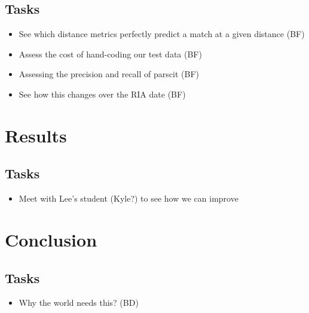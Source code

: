 \documentclass[12pt]{article}
\begin{document}
\subsection{Tasks}

\begin{itemize}
\item See which distance metrics perfectly predict a match at a given distance (BF)
\item Assess the cost of hand-coding our test data (BF)
\item Assessing the precision and recall of parscit (BF)
\item See how this changes over the RIA date (BF)
\end{itemize}



\section{Results}

\subsection{Tasks}

\begin{itemize}
\item Meet with Lee's student (Kyle?) to see how we can improve
\end{itemize}


\section{Conclusion}

\subsection{Tasks}

\begin{itemize}
\item Why the world needs this? (BD)
\end{itemize}


\clearpage
\singlespace

\nocite{*}

\clearpage
\end{document}
